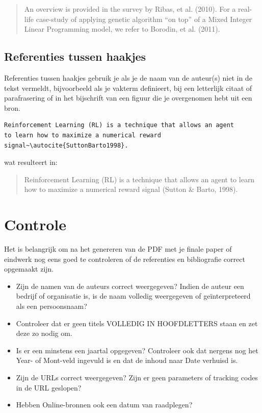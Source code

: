 \begin{quotation}
  An overview is provided in the survey by Ribas, et al. (2010). For a real-life case-study of applying genetic algorithm ``on top'' of a Mixed Integer Linear Programming model, we refer to Borodin, et al. (2011).
\end{quotation}

\subsection{Referenties tussen haakjes}%
\label{ssec:referenties_tussen_haakjes}

Referenties tussen haakjes gebruik je als je de naam van de auteur(s) niet in de tekst vermeldt, bijvoorbeeld als je vakterm definieert, bij een letterlijk citaat of parafrasering of in het bijschrift van een figuur die je overgenomen hebt uit een bron.

\begin{verbatim}
Reinforcement Learning (RL) is a technique that allows an agent
to learn how to maximize a numerical reward
signal~\autocite{SuttonBarto1998}.
\end{verbatim}

wat resulteert in:

\begin{quotation}
  Reinforcement Learning (RL) is a technique that allows an agent to learn how to maximize a numerical reward signal (Sutton \& Barto, 1998).
\end{quotation}

\section{Controle}%
\label{sec:bibliografie-controle}

Het is belangrijk om na het genereren van de PDF met je finale paper of eindwerk nog eens goed te controleren of de referenties en bibliografie correct opgemaakt zijn.

\begin{itemize}
  \item Zijn de namen van de auteurs correct weergegeven? Indien de auteur een bedrijf of organisatie is, is de naam volledig weergegeven of geïnterpreteerd als een persoonsnaam?
  \item Controleer dat er geen titels VOLLEDIG IN HOOFDLETTERS staan en zet deze zo nodig om.
  \item Is er een minstens een jaartal opgegeven? Controleer ook dat nergens nog het Year- of Mont-veld ingevuld is en dat de inhoud naar Date verhuisd is.
  \item Zijn de URLs correct weergegeven? Zijn er geen parameters of tracking codes in de URL geslopen?
  \item Hebben Online-bronnen ook een datum van raadplegen?
  \end{itemize}


